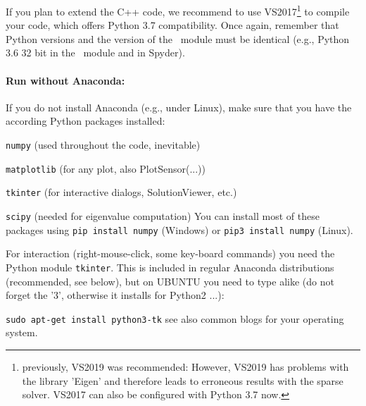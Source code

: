 \ei
If you plan to extend the C++ code, we recommend to use VS2017\footnote{previously, VS2019 was recommended: However, VS2019 has problems with the library 'Eigen' and therefore leads to erroneous results with the sparse solver. VS2017 can also be configured with Python 3.7 now.} to compile your code, which offers Python 3.7 compatibility.
Once again, remember that Python versions and the version of the \codeName\ module must be identical (e.g., Python 3.6 32 bit  in the \codeName\ module and in Spyder).

\paragraph{Run without Anaconda:}
If you do not install Anaconda (e.g., under Linux), make sure that you have the according Python packages installed:
\bi
  \item \texttt{numpy} (used throughout the code, inevitable)
  \item \texttt{matplotlib} (for any plot, also PlotSensor(...))
  \item \texttt{tkinter} (for interactive dialogs, SolutionViewer, etc.)
  \item \texttt{scipy} (needed for eigenvalue computation)
\ei
You can install most of these packages using \texttt{pip install numpy} (Windows) or \texttt{pip3 install numpy} (Linux).

For interaction (right-mouse-click, some key-board commands) you need the Python module \texttt{tkinter}. This is included in regular Anaconda distributions (recommended, see below), but on UBUNTU you need to type alike (do not forget the '3', otherwise it installs for Python2 ...):
\bi
  \item[] \texttt{sudo apt-get install python3-tk}
\ei
see also common blogs for your operating system.

